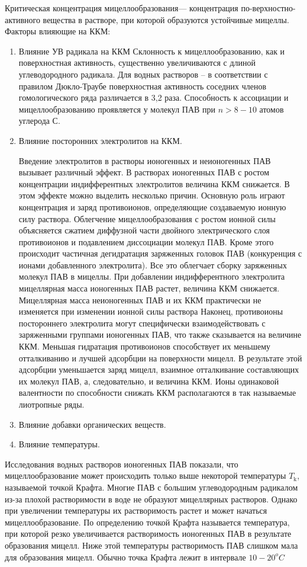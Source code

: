\documentclass[a4paper,12pt]{article} %
\begin{document}
Критическая концентрация мицеллообразования— концентрация по-верхностно-активного вещества в растворе, при которой образуются устойчивые мицеллы. 
Факторы влияющие на ККМ: 
\begin{enumerate}
\item Влияние УВ радикала на ККМ 
Склонность к мицеллообразованию, как и поверхностная активность, существенно увеличиваются с длиной углеводородного радикала. Для водных растворов – в соответствии с правилом Дюкло-Траубе поверхностная активность соседних членов гомологического ряда различается в 3,2 раза. Способность к ассоциации и мицеллообразованию проявляется у молекул ПАВ при $n > 8 - 10$ атомов углерода С. 
\item Влияние посторонних электролитов на ККМ. 

Введение электролитов в растворы ионогенных и неионогенных ПАВ вызывает различный эффект. В растворах ионогенных ПАВ с ростом концентрации индифферентных электролитов величина ККМ снижается. В этом эффекте можно выделить несколько причин. Основную роль играют концентрация и заряд противоионов, определяющие создаваемую ионную силу раствора. Облегчение мицеллообразования с ростом ионной силы объясняется сжатием диффузной части двойного электрического слоя противоионов и подавлением диссоциации молекул ПАВ. Кроме этого происходит частичная дегидратация заряженных головок ПАВ (конкуренция с ионами добавленного электролита). Все это облегчает сборку заряженных молекул ПАВ в мицеллы. При 
добавлении индифферентного электролита мицеллярная масса ионогенных ПАВ растет, величина ККМ снижается. Мицеллярная масса неионогенных ПАВ и их ККМ практически не изменяется при изменении ионной силы раствора Наконец, противоионы постороннего электролита могут специфически взаимодействовать с заряженными группами ионогенных ПАВ, что также сказывается на величине ККМ. Меньшая гидратация противоионов способствует их меньшему отталкиванию и лучшей адсорбции на поверхности мицелл. В результате этой адсорбции уменьшается заряд мицелл, взаимное отталкивание составляющих их молекул ПАВ, а, следовательно, и величина ККМ. Ионы одинаковой валентности по способности снижать ККМ располагаются в так называемые лиотропные ряды. 
\item Влияние добавки органических веществ. 
\item Влияние температуры.
\end{enumerate}
Исследования водных растворов ионогенных ПАВ показали, что мицеллообразование может происходить только выше некоторой температуры $T_\text{k}$, называемой точкой Крафта. Многие ПАВ с большим углеводородным радикалом из-за плохой растворимости в воде не образуют мицеллярных растворов. Однако при увеличении температуры их растворимость растет и может начаться мицеллообразование. По определению точкой Крафта называется температура, при которой резко увеличивается растворимость ионогенных ПАВ в результате образования мицелл. Ниже этой температуры растворимость ПАВ слишком мала для образования мицелл. Обычно точка Крафта лежит в интервале $10-20^oC $
\end{document}

